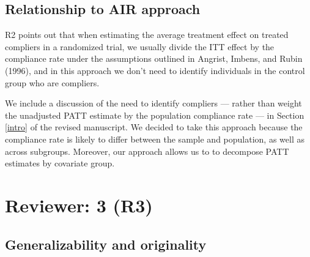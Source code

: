 \documentclass[hidelinks,12pt,letterpaper]{article}
\begin{document}
\subsection{Relationship to AIR approach}\label{reweighting}

R2 points out that when estimating the average treatment effect on treated compliers in a randomized trial, we usually divide the ITT effect by the compliance rate under the assumptions outlined in Angrist, Imbens, and Rubin (1996), and in this approach we don't need to identify individuals in the control group who are compliers.

We include a discussion of the need to identify compliers --- rather than weight the unadjusted PATT estimate by the population compliance rate --- in Section \ref{intro} of the revised manuscript. We decided to take this approach because the compliance rate is likely to differ between the sample and population, as well as across subgroups. Moreover, our approach allows us to to decompose PATT estimates by covariate group. 

\section{Reviewer: 3 (R3)}

\subsection{Generalizability and originality}
\end{document}
